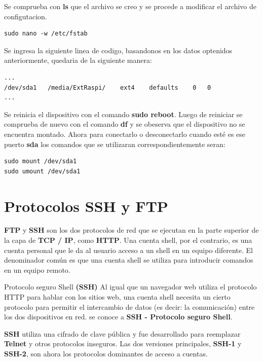 \documentclass{article}
\begin{document}
Se comprueba con \textbf{ls} que el archivo se creo y se procede a modificar el archivo de configutacion.

\begin{verbatim}
sudo nano -w /etc/fstab
\end{verbatim}

Se ingresa la siguiente linea de codigo, basandonos en los datos optenidos anteriormente, quedaria de la siguiente manera:

\begin{verbatim}
...
/dev/sda1   /media/ExtRaspi/    ext4    defaults	0	0
...
\end{verbatim}


Se reinicia el dispositivo con el comando \textbf{sudo reboot}. Luego de reiniciar se comprueba de nuevo con el comando \textbf{df} y se obeserva que el dispositivo no se encuentra montado. Ahora para conectarlo o desconectarlo cuando esté es ese puerto \textbf{sda} los comandos que se utilizaran correspondientemente seran:

\begin{verbatim}
sudo mount /dev/sda1
sudo umount /dev/sda1 
\end{verbatim}

\section{Protocolos SSH y FTP}

\textbf{FTP} y \textbf{SSH} son los dos protocolos de red que se ejecutan en la parte superior de la capa de \textbf{TCP / IP}, como \textbf{HTTP}. Una cuenta shell, por el contrario, es una cuenta personal que le da al usuario acceso a un shell en un equipo diferente. El denominador común es que una cuenta shell se utiliza para introducir comandos en un equipo remoto. \newline

Protocolo seguro Shell \textbf{(SSH)} Al igual que un navegador web utiliza el protocolo HTTP para hablar con los sitios web, una cuenta shell necesita un cierto protocolo para permitir el intercambio de datos (es decir: la comunicación) entre los dos dispositivos en red. se conoce a \textbf{SSH - Protocolo seguro Shell}. \newline

\textbf{SSH} utiliza una cifrado de clave pública y fue desarrollado para reemplazar \textbf{Telnet} y otros protocolos inseguros. Las dos versiones principales, \textbf{SSH-1} y \textbf{SSH-2}, son ahora los protocolos dominantes de acceso a cuentas. \newline
\end{document}
